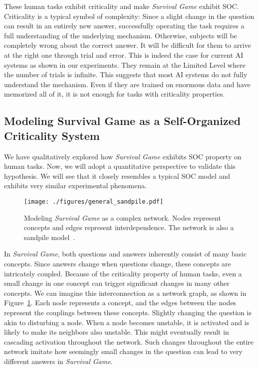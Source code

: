 These human tasks exhibit criticality and make \textit{Survival Game} exhibit SOC. Criticality is a typical symbol of complexity: Since a slight change in the question can result in an entirely new answer, successfully operating the task requires a full understanding of the underlying mechanism. Otherwise, subjects will be completely wrong about the correct answer. It will be difficult for them to arrive at the right one through trial and error. This is indeed the case for current AI systems as shown in our experiments. They remain at the Limited Level where the number of trials is infinite. This suggests that most AI systems do not fully understand the mechanism. 
Even if they are trained on enormous data and have memorized all of it, it is not enough for tasks with criticality properties.




\subsection{Modeling Survival Game as a Self-Organized Criticality System}



We have qualitatively explored how \textit{Survival Game} exhibits SOC property on human tasks. Now, we will adopt a quantitative perspective to validate this hypothesis. We will see that it closely resembles a typical SOC model and exhibits very similar experimental phenomena.


\begin{figure}[t]
  \centering
  \texttt{[image: ./figures/general\_sandpile.pdf]}
  \caption{Modeling \textit{Survival Game} as a complex network. Nodes represent concepts and edges represent interdependence. The network is also a sandpile model~\citep{PhysRevLett.59.381}.}
  \label{fig:soc_nodes}
\end{figure}





In \textit{Survival Game}, both questions and answers inherently consist of many basic concepts. Since answers change when questions change, these concepts are intricately coupled. Because of the criticality property of human tasks, even a small change in one concept can trigger significant changes in many other concepts. We can imagine this interconnection as a network graph, as shown in Figure~\ref{fig:soc_nodes}. Each node represents a concept, and the edges between the nodes represent the couplings between these concepts. Slightly changing the question is akin to disturbing a node. When a node becomes unstable, it is activated and is likely to make its neighbors also unstable. This might eventually result in cascading activation throughout the network. Such changes throughout the entire network imitate how seemingly small changes in the question can lead to very different answers in \textit{Survival Game}.



